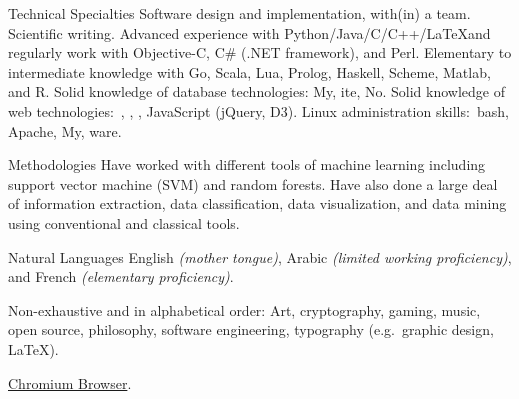\documentclass[10pt,a4paper]{article}
\begin{document}
\spacedhrule{0.5em}{-0.4em} %



\inlineheadsection
{Technical Specialties}
{Software design and implementation, with(in) a team. Scientific writing. Advanced experience with Python/Java/C/C++/\LaTeX and regularly work with Objective-C, C\# (.NET framework), and Perl. Elementary to intermediate knowledge with Go, Scala, Lua, Prolog, Haskell, Scheme, Matlab, and R. Solid knowledge of database technologies: My, ite, No. Solid knowledge of web technologies:\ , , , JavaScript (jQuery, D3). Linux administration skills:\ bash, Apache, My, ware.}

\inlineheadsection 
{Methodologies}
{Have worked with different tools of machine learning including support vector machine (SVM) and random forests. Have also done a large deal of information extraction, data classification, data visualization, and data mining using conventional and classical tools.}

\inlineheadsection 
{Natural Languages}
{English \textit{(mother tongue)}, Arabic \textit{(limited working proficiency)}, and French \textit{(elementary proficiency)}.}


\spacedhrule{1.6em}{-0.4em} %



\inlineheadsection %
{Non-exhaustive and in alphabetical order:}
{Art, cryptography, gaming, music, open source, philosophy, software engineering, typography (e.g.\ graphic design, \LaTeX).}


\spacedhrule{1.6em}{-0.4em} %



{\href{http://www.chromium.org}{Chromium Browser}.}

\end{document}
